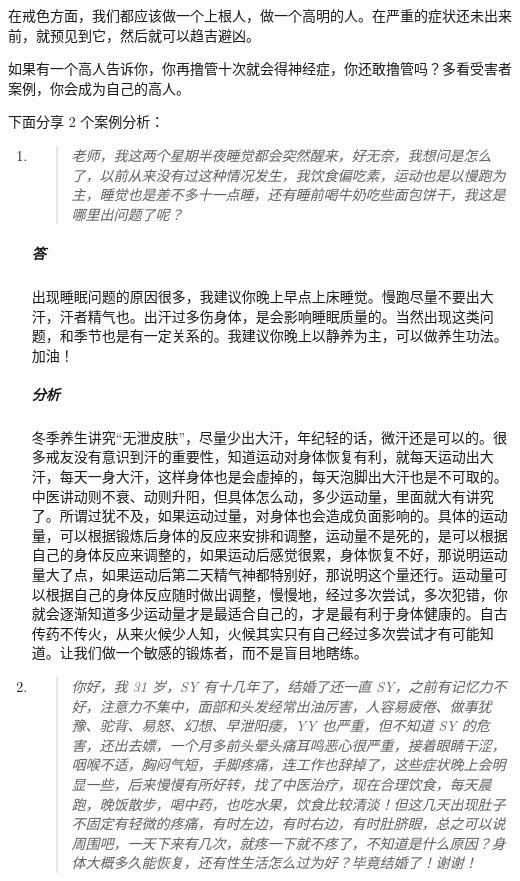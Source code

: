 \documentclass[fontset=founder]{ctexart}
\begin{document}
在戒色方面，我们都应该做一个上根人，做一个高明的人。在严重的症状还未出来前，就预见到它，然后就可以趋吉避凶。

如果有一个高人告诉你，你再撸管十次就会得神经症，你还敢撸管吗？多看受害者案例，你会成为自己的高人。

下面分享 2 个案例分析：

\begin{enumerate}
    \item \begin{quote}\it
        老师，我这两个星期半夜睡觉都会突然醒来，好无奈，我想问是怎么了，以前从来没有过这种情况发生，我饮食偏吃素，运动也是以慢跑为主，睡觉也是差不多十一点睡，还有睡前喝牛奶吃些面包饼干，我这是哪里出问题了呢？
    \end{quote}
    \subparagraph{答} 出现睡眠问题的原因很多，我建议你晚上早点上床睡觉。慢跑尽量不要出大汗，汗者精气也。出汗过多伤身体，是会影响睡眠质量的。当然出现这类问题，和季节也是有一定关系的。我建议你晚上以静养为主，可以做养生功法。加油！
    \subparagraph{分析} 冬季养生讲究“无泄皮肤”，尽量少出大汗，年纪轻的话，微汗还是可以的。很多戒友没有意识到汗的重要性，知道运动对身体恢复有利，就每天运动出大汗，每天一身大汗，这样身体也是会虚掉的，每天泡脚出大汗也是不可取的。中医讲动则不衰、动则升阳，但具体怎么动，多少运动量，里面就大有讲究了。所谓过犹不及，如果运动过量，对身体也会造成负面影响的。具体的运动量，可以根据锻炼后身体的反应来安排和调整，运动量不是死的，是可以根据自己的身体反应来调整的，如果运动后感觉很累，身体恢复不好，那说明运动量大了点，如果运动后第二天精气神都特别好，那说明这个量还行。运动量可以根据自己的身体反应随时做出调整，慢慢地，经过多次尝试，多次犯错，你就会逐渐知道多少运动量才是最适合自己的，才是最有利于身体健康的。自古传药不传火，从来火候少人知，火候其实只有自己经过多次尝试才有可能知道。让我们做一个敏感的锻炼者，而不是盲目地瞎练。
    \item \begin{quote}\it
        你好，我 31 岁，SY 有十几年了，结婚了还一直 SY，之前有记忆力不好，注意力不集中，面部和头发经常出油厉害，人容易疲倦、做事犹豫、驼背、易怒、幻想、早泄阳痿，YY 也严重，但不知道 SY 的危害，还出去嫖，一个月多前头晕头痛耳鸣恶心很严重，接着眼睛干涩，咽喉不适，胸闷气短，手脚疼痛，连工作也辞掉了，这些症状晚上会明显一些，后来慢慢有所好转，找了中医治疗，现在合理饮食，每天晨跑，晚饭散步，喝中药，也吃水果，饮食比较清淡！但这几天出现肚子不固定有轻微的疼痛，有时左边，有时右边，有时肚脐眼，总之可以说周围吧，一天下来有几次，就疼一下就不疼了，不知道是什么原因？身体大概多久能恢复，还有性生活怎么过为好？毕竟结婚了！谢谢！
    \end{quote}

\end{enumerate}
\end{document}
